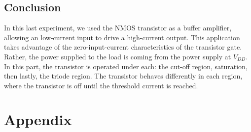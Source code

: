 \documentclass{report}
\begin{document}
\subsection{Conclusion}
In this last experiment, we used the NMOS transistor as a buffer amplifier, allowing an low-current input to drive a high-current output. This application takes advantage of the zero-input-current characteristics of the transistor gate. Rather, the power supplied to the load is coming from the power supply at $V_{DD}$. In this part, the transistor is operated under each: the cut-off region, saturation, then lastly, the triode region. The transistor behaves differently in each region, where the transistor is off until the threshold current is reached.
\pagebreak
\section*{Appendix}
\end{document}
